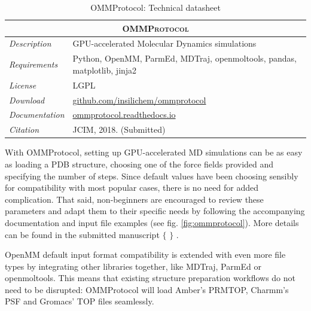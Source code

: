 \begin{table}[hbtp]
	\caption{OMMProtocol: Technical datasheet}
	\footnotesize
	\newcommand{\tableheading}[1]{\multicolumn{2}{c}{\textsc{#1}}}
	\begin{tabularx}{\textwidth}{RL}
		\toprule
		\tableheading{OMMProtocol}\\
		\toprule
		\textit{Description} & GPU-accelerated Molecular Dynamics simulations \\
		\midrule
		\textit{Requirements} & Python, OpenMM, ParmEd, MDTraj, openmoltools, pandas, matplotlib, jinja2 \\
		\midrule
		\textit{License} & LGPL \\
		\midrule
		\textit{Download} & \href{https://github.com/insilichem/ommprotocol}{github.com/insilichem/ommprotocol} \\
		\midrule
		\textit{Documentation} & \href{http://ommprotocol.readthedocs.io}{ommprotocol.readthedocs.io} \\
		\midrule
		\textit{Citation} & JCIM, 2018. (Submitted) \\
		\bottomrule

	\end{tabularx}
\end{table}

With OMMProtocol, setting up GPU-accelerated MD simulations can be as easy as loading a PDB structure, choosing one of the force fields provided and specifying the number of steps. Since default values have been choosing sensibly for compatibility with most popular cases, there is no need for added complication. That said, non-beginners are encouraged to review these parameters and adapt them to their specific needs by following the accompanying documentation and input file examples (see fig. \ref{fig:ommprotocol}). More details can be found in the submitted manuscript $ \{ $ $ \} $ .

OpenMM default input format compatibility is extended with even more file types by integrating other libraries together, like MDTraj, ParmEd or openmoltools. This means that existing structure preparation workflows do not need to be disrupted: OMMProtocol will load Amber’s PRMTOP, Charmm’s PSF and Gromacs’ TOP files seamlessly.


